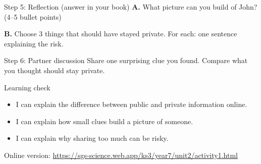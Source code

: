 \documentclass[10pt,a4paper]{article}
\begin{document}
\begin{StepBox}{Step 5: Reflection (answer in your book)}
\textbf{A.} What picture can you build of John? (4--5 bullet points)\par
\textbf{B.} Choose 3 things that should have stayed private. For each: one sentence explaining the risk.
\end{StepBox}

\begin{StepBox}{Step 6: Partner discussion}
Share one surprising clue you found. Compare what you thought should stay private.
\end{StepBox}

\begin{InfoBox}{Learning check}
\begin{itemize}[leftmargin=*,label=$\square$,nosep]
  \item I can explain the difference between public and private information online.
  \item I can explain how small clues build a picture of someone.
  \item I can explain why sharing too much can be risky.
\end{itemize}
\end{InfoBox}

{\small\color{sgsGrey}Online version: \url{https://sgs-science.web.app/ks3/year7/unit2/activity1.html}}
\end{document}
